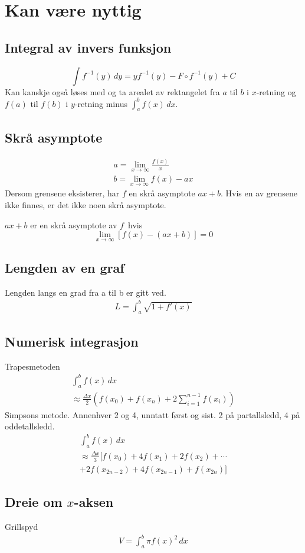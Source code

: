 \documentclass[defaultpackages]{cheatsheet}
\newcommand*{\skippingparagraph}{\par\vspace{\baselineskip}\noindent}
\begin{document}
	\section{Kan være nyttig}
	\subsection{Integral av invers funksjon}
	\phantom{}
	\[\int f^{-1}(y)\,dy = yf^{-1}(y)-F\circ f^{-1}(y) + C\]
	Kan kanskje også løses med og ta arealet av rektangelet fra $a$ til $b$ i $x$-retning og $f(a)$ til $f(b)$ i $y$-retning minus $\int_a^b f(x) \,dx$.
	\subsection{Skrå asymptote}
	\begin{gather*}
		a = \lim_{x\to\infty} \frac{f(x)}{x}\\
		b = \lim_{x\to\infty} f(x) - ax
	\end{gather*}
	Dersom grensene eksisterer, har $f$ en skrå asymptote $ax+b$. Hvis en av grensene ikke finnes, er det ikke noen skrå asymptote.
	\skippingparagraph
	$ax+b$ er en skrå asymptote av $f$ hvis
	\[\lim_{x\to\infty} \left[f(x) - (ax+b)\right] = 0\]
	\subsection{Lengden av en graf}
	Lengden langs en grad fra a til b er gitt ved.
	\begin{gather*}
		L = \int_a^b \sqrt{1+f'(x)}
	\end{gather*}
	\subsection{Numerisk integrasjon}
	Trapesmetoden
	\begin{gather*}
		\int_a^bf(x)\,dx \\
		\approx \frac{\Delta x}{2}\left(f(x_0) + f(x_n) + 2 \sum_{i=1}^{n-1}f(x_i)\right)
	\end{gather*}
	Simpsons metode. Annenhver 2 og 4, unntatt først og sist. 2 på partallsledd, 4 på oddetallsledd.
	\begin{gather*}
		\int_a^bf(x)\,dx \\
		\approx \frac{\Delta x}{3}[f(x_0)+4f(x_1)+2f(x_2)+\cdots\\
		+2f(x_{2n-2}) + 4f(x_{2n-1}) + f(x_{2n})]
	\end{gather*}
	\subsection{Dreie om $x$-aksen}
	Grillspyd
	\begin{gather*}
		V = \int_a^b \pi f(x)^2\,dx
	\end{gather*}
\end{document}
